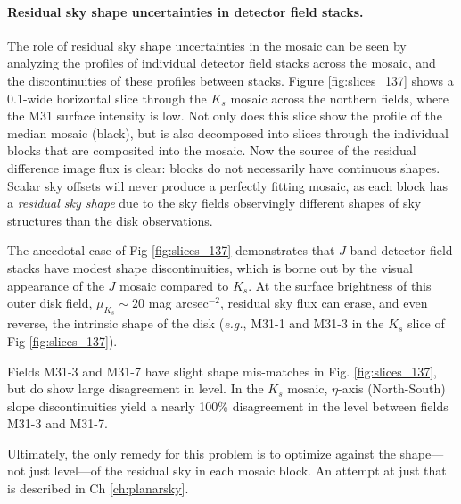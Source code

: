 \documentclass[iop]{emulateapj}
\newcommand{\eg}{\textit{e.g.}}
\begin{document}
\paragraph{Residual sky shape uncertainties in detector field stacks.}


The role of residual sky shape uncertainties in the mosaic can be seen by analyzing the profiles of individual detector field stacks across the mosaic, and the discontinuities of these profiles between stacks. Figure \ref{fig:slices_137} shows a 0.1\arcdeg -wide horizontal slice through the $K_s$ mosaic across the northern fields, where the M31 surface intensity is low. Not only does this slice show the profile of the median mosaic (black), but is also decomposed into slices through the individual blocks that are composited into the mosaic. Now the source of the residual difference image flux is clear: blocks do not necessarily have continuous shapes. Scalar sky offsets will never produce a perfectly fitting mosaic, as each block has a \emph{residual sky shape} due to the sky fields observingly different shapes of sky structures than the disk observations.

The anecdotal case of Fig \ref{fig:slices_137} demonstrates that $J$ band detector field stacks have modest shape discontinuities, which is borne out by the visual appearance of the $J$ mosaic compared to $K_s$. At the surface brightness of this outer disk field, $\mu_{K_s}\sim 20$ mag arcsec$^{-2}$, residual sky flux can erase, and even reverse, the intrinsic shape of the disk (\eg, M31-1 and M31-3 in the $K_s$ slice of Fig \ref{fig:slices_137}).

Fields M31-3 and M31-7 have slight shape mis-matches in Fig. \ref{fig:slices_137}, but do show large disagreement in level. In the $K_s$ mosaic, $\eta$-axis (North-South) slope discontinuities yield a nearly 100\% disagreement in the level between fields M31-3 and M31-7.

Ultimately, the only remedy for this problem is to optimize against the shape---not just level---of the residual sky in each mosaic block. An attempt at just that is described in Ch \ref{ch:planarsky}.



\end{document}
